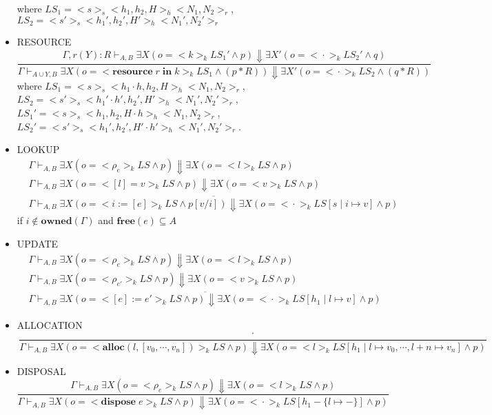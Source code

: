 \documentclass{lmcs} %
\theoremstyle{plain}\newtheorem{satz}[thm]{Satz} %
\begin{document}
\begin{itemize}
where $LS_1=<\!\!s\!\!>_s<\!\!h_1,h_2,H\!\!>_h<\!\!N_1,N_2\!\!>_r$, $LS_2=<\!\!s'\!\!>_s<\!\!h_1',h_2',H'\!\!>_h<\!\!N_1',N_2'\!\!>_r$
\item RESOURCE
$$\dfrac{\Gamma,r(Y):R \vdash_{A,B} \exists X(o=<\!\!k\!\!>_k LS_1'\land p )\Downarrow \exists X'(o=<\!\!\cdot\!\!>_k LS_2'\land q)}{\Gamma \vdash_{A\cup Y,B} \exists X(o=<\!\!\mathbf{resource}\;r\;\mathbf{in}\;k\!\!>_k LS_1\land (p*R))\Downarrow \exists X'(o=<\!\!\cdot\!\!>_k LS_2\land (q*R))}$$
where $LS_1=<\!\!s\!\!>_s<\!\!h_1\cdot h,h_2,H\!\!>_h<\!\!N_1,N_2\!\!>_r$, $LS_2=<\!\!s'\!\!>_s<\!\!h_1'\cdot h',h_2',H'\!\!>_h<\!\!N_1',N_2'\!\!>_r$, $LS_1'=<\!\!s\!\!>_s<\!\!h_1,h_2,H\cdot h\!\!>_h<\!\!N_1,N_2\!\!>_r$, $LS_2'=<\!\!s'\!\!>_s<\!\!h_1',h_2',H'\cdot h'\!\!>_h<\!\!N_1',N_2'\!\!>_r$.
\item LOOKUP
\begin{align*}
   &\Gamma \vdash_{A,B} \exists X(o=<\!\!\rho_e\!\!>_k LS\land p)\Downarrow \exists X(o=<\!\!l\!\!>_k LS\land p)\\
   &\Gamma \vdash_{A,B} \exists X(o=<\!\![l]=v\!\!>_k LS\land p)\Downarrow\exists X(o=<\!\!v\!\!>_k LS\land p)\\
   &\overline{\Gamma \vdash_{A,B} \exists X (o=<\!\!i:=[e]\!\!>_k LS\land p[v/i])\Downarrow\exists X (o=<\!\!\cdot\!\!>_k LS[s\mid i\mapsto v]\land p)}
\end{align*}
if
$i\notin \mathbf{owned}(\Gamma)$ and $\mathbf{free}(e)\subseteq A$
\item UPDATE
\begin{align*}
   &\Gamma \vdash_{A,B} \exists X(o=<\!\!\rho_e\!\!>_k LS\land p)\Downarrow \exists X(o=<\!\!l\!\!>_k LS\land p)\\
   &\Gamma \vdash_{A,B} \exists X(o=<\!\!\rho_{e'}\!\!>_k LS\land p)\Downarrow\exists X(o=<\!\!v\!\!>_k LS\land p)\\
   &\overline{\Gamma \vdash_{A,B} \exists X (o=<\!\![e]:=e'\!\!>_k LS\land p)\Downarrow\exists X (o=<\!\!\cdot\!\!>_k LS[h_1\mid l\mapsto v]\land p)}
\end{align*}
\item ALLOCATION
  $$\dfrac{\cdot}{\Gamma \vdash_{A,B} \exists X(o\!=<\!\!\mathbf{alloc}(l,[v_0,\!\cdots\!,v_n])\!\!>_k\! LS\!\land\! p)\!\Downarrow \!\exists X(o\!=<\!\!l\!\!>_k \!LS[h_1 \mid l\mapsto v_0,\!\cdots\!,l\!+\!n\!\mapsto\!v_n]\!\land \!p)}$$
\item DISPOSAL
$$\dfrac{\Gamma \vdash_{A,B} \exists X(o=<\!\!\rho_e\!\!>_k LS\land p)\Downarrow \exists X(o=<\!\!l\!\!>_k LS\land p)}{\Gamma \vdash_{A,B} \exists X(o=<\!\!\mathbf{dispose}\;e\!\!>_k LS\land p)\Downarrow \exists X(o=<\!\!\cdot\!\!>_kLS[h_1-\{l\mapsto-\}]\land p)}$$

\end{itemize}
\end{document}
